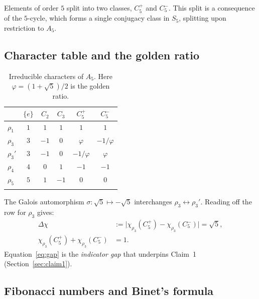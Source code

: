 \documentclass[sn-mathphys-num,Numbered]{sn-jnl}
\theoremstyle{thmstyleone}
\theoremstyle{thmstylethree}
\theoremstyle{thmstyletwo}
\begin{document}
Elements of order $5$ split into two classes, $C_5^+$ and $C_5^-$.
This split is a consequence of the $5$-cycle, which forms a single
conjugacy class in $S_5$, splitting upon restriction to $A_5$.

\subsection{Character table and the golden ratio}
\label{ssec:chartable}

\begin{table}[h]
\caption{Irreducible characters of $A_5$.
Here $\varphi = (1+\sqrt{5})/2$ is the golden ratio.}
\label{tab:characters}
\begin{tabular}{@{}lccccc@{}}
\toprule
 & $\{e\}$ & $C_2$ & $C_3$ & $C_5^+$ & $C_5^-$ \\
\midrule
$\rho_1$ & $1$  & $1$  & $1$  & $1$           & $1$ \\
$\rho_3$ & $3$  & $-1$ & $0$  & $\varphi$     & $-1/\varphi$ \\
$\rho_3'$& $3$  & $-1$ & $0$  & $-1/\varphi$  & $\varphi$ \\
$\rho_4$ & $4$  & $0$  & $1$  & $-1$          & $-1$ \\
$\rho_5$ & $5$  & $1$  & $-1$ & $0$           & $0$ \\
\botrule
\end{tabular}
\end{table}

The Galois automorphism $\sigma\colon\sqrt{5}\mapsto -\sqrt{5}$
interchanges $\rho_3 \leftrightarrow \rho_3'$. Reading off the row for
$\rho_3$ gives:
\begin{align}
  \Delta\chi &:= \bigl|\chi_{\rho_3}(C_5^+) - \chi_{\rho_3}(C_5^-)\bigr|
               = \sqrt{5}, \label{eq:gap} \\
  \chi_{\rho_3}(C_5^+) + \chi_{\rho_3}(C_5^-) &= 1. \label{eq:sum}
\end{align}
Equation~\eqref{eq:gap} is the \emph{indicator gap} that underpins
Claim~1 (Section~\ref{sec:claim1}).

\subsection{Fibonacci numbers and Binet's formula}
\label{ssec:fibonacci}
\end{document}
